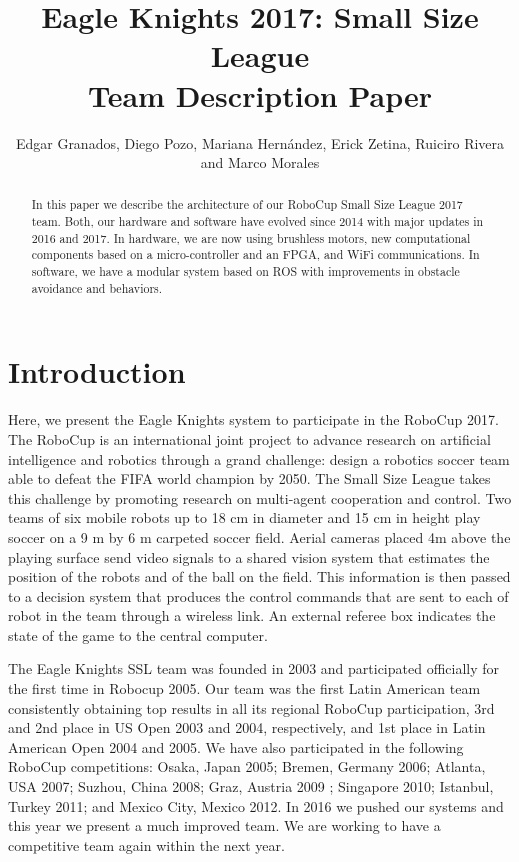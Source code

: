 \documentclass[]{llncs}
\title{\bf Eagle Knights 2017: Small Size League\\ Team Description Paper}
\author{Edgar Granados, Diego Pozo, Mariana Hernández, Erick Zetina, Ruiciro Rivera and Marco Morales}
\institute{Robotics Laboratory, Department of Digital Systems, ITAM\\
Río Hondo 1, Ciudad de México, 01080, México}
\date{}
\newcommand{\TODO}[1]{{\textcolor{blue}{ToDo: {#1}}}}
\begin{document}
\ifpdf
{}
\else
{}
\fi

\maketitle
\begin{abstract}
In this paper we describe the architecture of our RoboCup Small Size League 2017 team. Both, our hardware and software have evolved since 2014 with major updates in 2016 and 2017. In hardware, we are now using brushless motors, new computational components based on a micro-controller and an FPGA, and WiFi communications. In software, we have a modular system based on ROS with improvements in obstacle avoidance and behaviors.
\end{abstract}

\section{Introduction}

Here, we present the Eagle Knights system to participate in the RoboCup 2017. The RoboCup \cite{robocup-ssl-rules} is an international joint project to advance research on artificial intelligence and robotics through a grand challenge: design a robotics soccer team able to defeat the FIFA world champion by 2050. The Small Size League takes this challenge by promoting research on multi-agent cooperation and control. Two teams of six mobile robots up to 18 cm in diameter and 15 cm in height play soccer on a 9 m by 6 m carpeted soccer field. Aerial cameras placed 4m above the playing surface send video signals to a shared vision system\cite{zlbwv-sslvtsvsftrcssl-RoboCup-2009} that estimates the position of the robots and of the ball on the field. This information is then passed to a decision system that produces the control commands that are sent to each of robot in the team through a wireless link. An external referee box indicates the state of the game to the central computer. 


The Eagle Knights SSL team was founded in 2003 and participated officially for the first time in Robocup 2005. Our team was the first Latin American team consistently obtaining top results in all its regional RoboCup participation, 3rd and 2nd place in US Open 2003 and 2004, respectively, and 1st place in Latin American Open 2004 and 2005. We have also participated in the following RoboCup competitions: Osaka, Japan 2005; Bremen, Germany 2006; Atlanta, USA 2007; Suzhou, China 2008; Graz, Austria 2009 ;  Singapore 2010; Istanbul, Turkey 2011; and Mexico City, Mexico 2012. In 2016 we pushed our systems and this year we present a much improved team. We are working to have a competitive team again within the next year.
\end{document}
